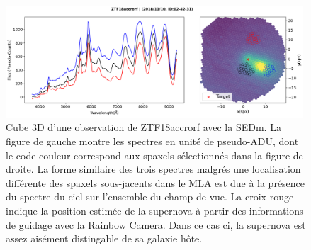 \documentclass[../main/main.tex]{subfiles}
\begin{document}
\begin{figure}[h]
  \centering
  \includegraphics[width=0.99\textwidth]{../figures/04_hypergal/e3dcube_ZTF18accrorf.png}
  \caption[Cube 3D SEDm de ZTF18accrorf]{Cube 3D d'une observation de
    ZTF18accrorf avec la SEDm. La figure de gauche montre les spectres
    en unité de pseudo-ADU, dont le code couleur correspond aux spaxels
    sélectionnés dans la figure de droite. La forme similaire des trois
    spectres malgrés une localisation différente des spaxels sous-jacents dans le MLA est due à la
    présence du spectre du ciel sur l'ensemble du champ de vue. La croix rouge indique la
    position estimée de la supernova à partir des informations de
    guidage avec la Rainbow Camera. Dans ce cas ci, la supernova est
    assez aisément distingable de sa galaxie hôte.}
  \label{fig:easycasesedm}
\end{figure}
\end{document}
